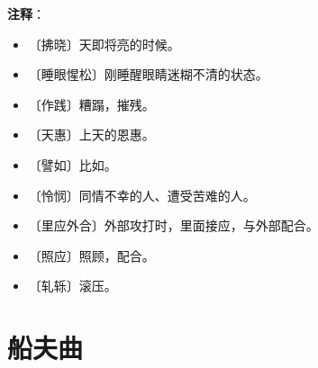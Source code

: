 \documentclass[12pt,UTF-8,openany]{ctexbook}
\begin{document}
\newpage

\textbf{注释}：

\vspace{-1em}

\begin{itemize}
    \setlength\itemsep{-0.2em}
    \item 〔拂晓〕天即将亮的时候。
    \item 〔睡眼惺松〕刚睡醒眼睛迷糊不清的状态。
    \item 〔作践〕糟蹋，摧残。
    \item 〔天惠〕上天的恩惠。
    \item 〔譬如〕比如。
    \item 〔怜悯〕同情不幸的人、遭受苦难的人。
    \item 〔里应外合〕外部攻打时，里面接应，与外部配合。
    \item 〔照应〕照顾，配合。
    \item 〔轧轹〕滚压。
\end{itemize}

\chapter{船夫曲}
\end{document}
